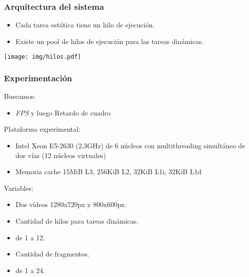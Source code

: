 \documentclass[11pt,a4paper,spanish]{beamer}
\begin{document}
\begin{frame}

\frametitle{Arquitectura del sistema}

\begin{itemize}

	\item Cada tarea estática tiene un hilo de ejecución.

	\item Existe un pool de hilos de ejecución para las tareas dinámicas.

\end{itemize}

\texttt{[image: img/hilos.pdf]}

\end{frame}

\begin{frame}

\frametitle{Experimentación}

Buscamos:

\begin{itemize}

	\item \emph{FPS} y luego Retardo de cuadro

\end{itemize}

Plataforma experimental:

\begin{itemize}

	\item Intel Xeon E5-2630 (2,3GHz) de 6 núcleos con multithreading
		simultáneo de dos vías (12 núcleos virtuales)

	\item Memoria cache 15MiB L3, 256KiB L2, 32KiB L1i, 32KiB L1d

\end{itemize}

Variables:

\begin{itemize}

	\item Dos vídeos 1280x720px y 800x600px.

	\item Cantidad de hilos para tareas dinámicas.

	\item de 1 a 12.

	\item Cantidad de fragmentos.

	\item de 1 a 24.

\end{itemize}

\end{frame}
\end{document}
